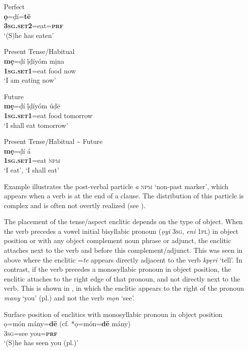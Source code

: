 \documentclass[output=paper]{langsci/langscibook}
\begin{document}
\ea
Perfect\\
\gll  \textbf{ọ}=ḍí=\textbf{tē}\\
     \textbf{\textsc{3sg.set2}}=eat=\textbf{\textsc{prf}}\\
\glt ‘(S)he has eaten’ \citep[284]{Kari2004}
\z

\ea
Present Tense/Habitual\\
\gll  \textbf{mẹ}=ḍí     ị́ḍíyóm   mịna\\
     \textbf{\textsc{1sg.set1}}=eat   food   now\\
\glt ‘I am eating now’ \citep[45]{Kari1997}
\z

\ea
Future\\
\gll  \textbf{mẹ}=ḍí     ị́ḍíyóm   úḍē\\
     \textbf{\textsc{1sg.set1}}=eat   food   tomorrow\\
\glt ‘I shall eat tomorrow’ \citep[45]{Kari1997}
\z

\ea
Present Tense/Habitual {\textasciitilde} Future\\
\gll  \textbf{mẹ}=ḍí     á\\
     \textbf{\textsc{1sg.set1}}=eat  \textsc{npm}\\
\glt ‘I eat’, ‘I shall eat’ \citep[45]{Kari1997}
\z

Example  illustrates the post-verbal particle \textit{a} \textsc{npm} ‘non-past marker’, which appears when a verb is at the end of a clause. The distribution of this particle is complex and is often not overtly realized (see \citealt[278--280]{Kari2004}).

The placement of the tense/aspect enclitic depends on the type of object. When the verb precedes a vowel initial bisyllabic pronoun (\textit{ọyi} \textsc{3sg}, \textit{eni} \textsc{1pl}) in object position or with any object complement noun phrase or adjunct, the enclitic attaches next to the verb and before this complement/adjunct. This was seen in  above where the enclitic =\textit{te} appears directly adjacent to the verb \textit{kpẹri} ‘tell’. In contrast, if the verb precedes a monosyllabic pronoun in object position, the enclitic attaches to the right edge of that pronoun, and not directly next to the verb. This is shown in , in which the enclitic appears to the right of the pronoun \textit{many} ‘you’ (pl.) and not the verb \textit{mọn} ‘see’.

\ea
{Surface position of enclitics with monosyllabic pronoun in object position}\\
\gll  ọ=món   mány=\textbf{dē}  (cf. *ọ=món=\textbf{dē} mány)\\
     3\textsc{sg}=see   you=\textbf{\textsc{prf}}\\
\glt ‘(S)he has seen you (pl.)’ \citep[341]{Kari2004} 
\z
\end{document}
